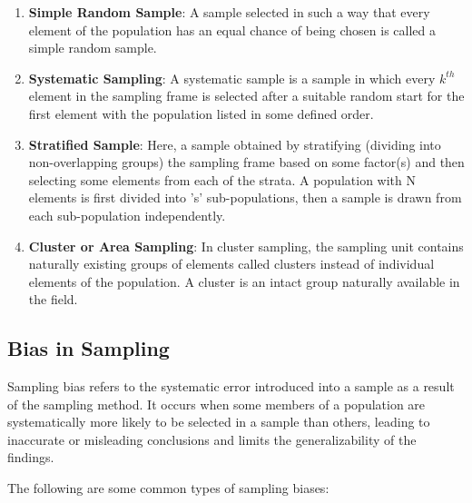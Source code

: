 \documentclass{article}
\begin{document}
\begin{enumerate}
    \item \textbf{Simple Random Sample}: A sample selected in such a way that every element of the population has an equal chance of being chosen is called a simple random sample.

    \item \textbf{Systematic Sampling}: A systematic sample is a sample in which every $k^{th}$ element in the sampling frame is selected after a suitable random start for the first element with the population listed in some defined order.

    \item \textbf{Stratified Sample}: Here, a sample obtained by stratifying (dividing into non-overlapping groups) the sampling frame based on some factor(s) and then selecting some elements from each of the strata. A population with N elements is first divided into 's' sub-populations, then a sample is drawn from each sub-population independently.

    \item \textbf{Cluster or Area Sampling}: In cluster sampling, the sampling unit contains naturally existing groups of elements called clusters instead of individual elements of the population. A cluster is an intact group naturally available in the field.

\end{enumerate}
\subsection{Bias in Sampling}

Sampling bias refers to the systematic error introduced into a sample as a result of the sampling method. It occurs when some members of a population are systematically more likely to be selected in a sample than others, leading to inaccurate or misleading conclusions and limits the generalizability of the findings. \cite{statistics_nutshell} \cite{scribbr_bias}

\noindent The following are some common types of sampling biases:
\end{document}

